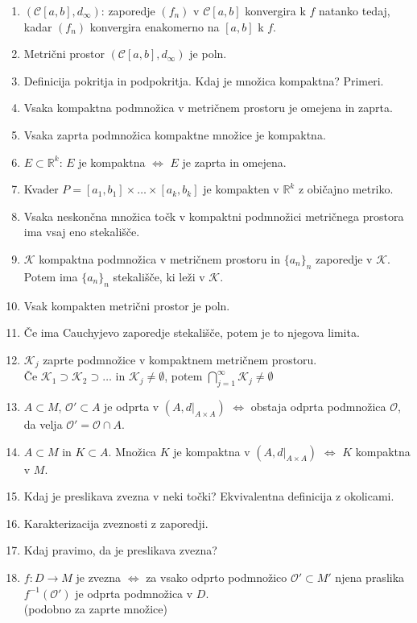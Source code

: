 \documentclass[a4paper,12pt]{report}
\begin{document}
\begin{enumerate}
    \item $(\mathcal{C}[a, b], d_{\infty})$: zaporedje $(f_n)$ v $\mathcal{C}[a, b]$ konvergira k $f$ natanko tedaj, kadar $(f_n)$ konvergira enakomerno na $[a, b]$ k $f$.
    \item Metrični prostor $(\mathcal{C}[a, b], d_{\infty})$ je poln.
    \item Definicija pokritja in podpokritja. Kdaj je množica kompaktna? Primeri.
    \item Vsaka kompaktna podmnožica v metričnem prostoru je omejena in zaprta.
    \item Vsaka zaprta podmnožica kompaktne množice je kompaktna.
    \item $E \subset \mathbb{R}^k$: $E$ je kompaktna $\iff$ $E$ je zaprta in omejena.
    \item Kvader $P = [a_1, b_1] \times \dots \times [a_k, b_k]$ je kompakten v $\mathbb{R}^k$ z običajno metriko.
    \item Vsaka neskončna množica točk v kompaktni podmnožici metričnega prostora ima vsaj eno stekališče.
    \item $\mathcal{K}$ kompaktna podmnožica v metričnem prostoru in $\{a_n\}_n$ zaporedje v $\mathcal{K}$. Potem ima $\{a_n\}_n$ stekališče, ki leži v $\mathcal{K}$.
    \item Vsak kompakten metrični prostor je poln.
    \item Če ima Cauchyjevo zaporedje stekališče, potem je to njegova limita.
    \item $\mathcal{K}_j$ zaprte podmnožice v kompaktnem metričnem prostoru. \\ Če $\mathcal{K}_1 \supset \mathcal{K}_2 \supset \dots$ in $\mathcal{K}_j \neq \emptyset$, potem $\bigcap\limits_{j=1}^{\infty} \mathcal{K}_j \neq \emptyset$
    \item $A \subset M$, $\mathcal{O}' \subset A$ je odprta v $(A, d|_{A \times A})$ $\iff$ obstaja odprta podmnožica $\mathcal{O}$, da velja $\mathcal{O}' = \mathcal{O} \cap A$.
    \item $A \subset M$ in $K \subset A$. Množica $K$ je kompaktna v $(A, d|_{A \times A})$ $\iff$ $K$ kompaktna v $M$.
    \item Kdaj je preslikava zvezna v neki točki? Ekvivalentna definicija z okolicami.
    \item Karakterizacija zveznosti z zaporedji.
    \item Kdaj pravimo, da je preslikava zvezna?
    \item $f: D \to M$ je zvezna $\iff$ za vsako odprto podmnožico $\mathcal{O}' \subset M'$ njena praslika $f^{-1}(\mathcal{O}')$ je odprta podmnožica v $D$. \\ (podobno za zaprte množice)

\end{enumerate}
\end{document}
